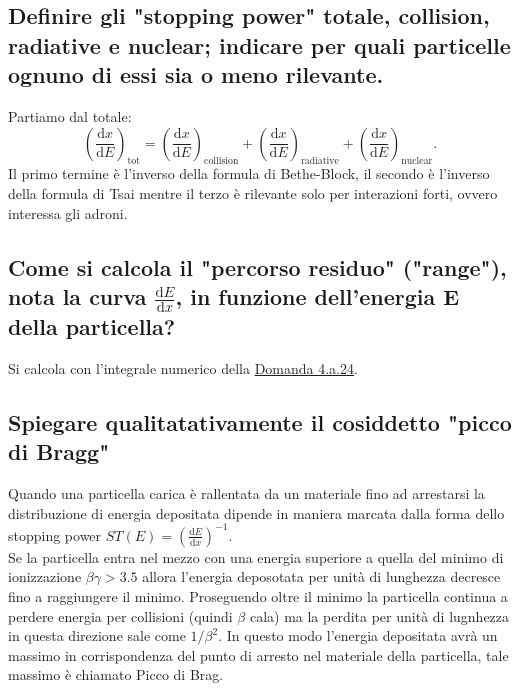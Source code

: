 \subsection[]{Definire gli "stopping power" totale, collision, radiative e nuclear; indicare per quali particelle ognuno di essi sia o meno rilevante.
}\label{sec:4.a.25}
Partiamo dal totale:
\[
	\left( \frac{\mbox{d} x}{\mbox{d} E} \right)_{\text{tot}}= \left( \frac{\mbox{d} x}{\mbox{d} E} \right)_{\text{collision}}+\left( \frac{\mbox{d} x}{\mbox{d} E} \right)_{\text{radiative}}+\left( \frac{\mbox{d} x}{\mbox{d} E} \right)_{\text{nuclear}}
.\] 
Il primo termine è l'inverso della formula di Bethe-Block, il secondo è l'inverso della formula di Tsai mentre il terzo è rilevante solo per interazioni forti, ovvero interessa gli adroni.

\subsection[]{Come si calcola il "percorso residuo" ("range"), nota la curva $\frac{\mbox{d} E}{\mbox{d} x}$, in funzione dell'energia E della particella?
}\label{sec:4.a.26}
Si calcola con l'integrale numerico della \hyperref[sec:4.a.24]{Domanda 4.a.24}.

\subsection[]{Spiegare qualitatativamente il cosiddetto "picco di Bragg"
}\label{sec:4.a.27}
Quando una particella carica è rallentata da un materiale fino ad arrestarsi la distribuzione di energia depositata dipende in maniera marcata dalla forma dello stopping power $ST\left( E \right) = \left( \frac{\mbox{d} E}{\mbox{d} x}  \right)^{-1}$.\\
Se la particella entra nel mezzo con una energia superiore a quella del minimo di ionizzazione $\beta \gamma > 3.5$ allora l'energia deposotata per unità di lunghezza decresce fino a raggiungere il minimo. Proseguendo oltre il minimo la particella continua a perdere energia per collisioni (quindi $\beta$ cala) ma la perdita per unità di lugnhezza in questa direzione sale come $1 /\beta^2$. In questo modo l'energia depositata avrà un massimo in corrispondenza del punto di arresto nel materiale della particella, tale massimo è chiamato Picco di Brag.

